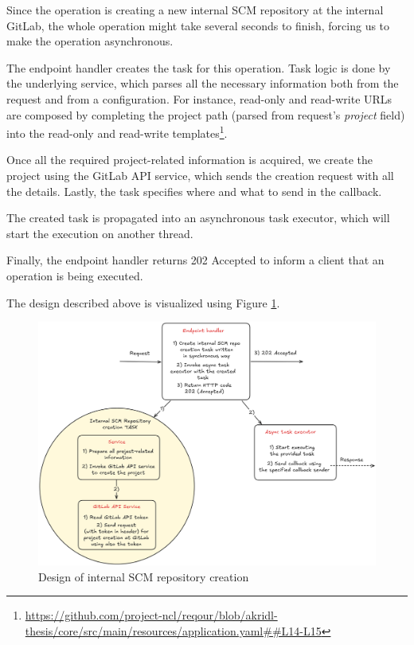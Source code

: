\documentclass[./main.tex]{subfiles}
\begin{document}
Since the operation is creating a new internal SCM repository at the internal GitLab, the whole operation might take several seconds to finish, forcing us to make the operation asynchronous.

The endpoint handler creates the task for this operation. Task logic is done by the underlying service, which parses all the necessary information both from the request and from a configuration. For instance, read-only and read-write URLs are composed by completing the project path (parsed from request's \textit{project} field) into the read-only and read-write templates\footnote{\url{https://github.com/project-ncl/reqour/blob/akridl-thesis/core/src/main/resources/application.yaml##L14-L15}}.

Once all the required project-related information is acquired, we create the project using the GitLab API service, which sends the creation request with all the details. Lastly, the task specifies where and what to send in the callback.

The created task is propagated into an asynchronous task executor, which will start the execution on another thread.

Finally, the endpoint handler returns 202 Accepted to inform a client that an operation is being executed.

The design described above is visualized using Figure \ref{fig:internal-scm-design}.

\begin{figure}
  \begin{center}
    \includegraphics[width=\textwidth]{images/internal-scm-design.png}
  \end{center}
  \caption{Design of internal SCM repository creation}
  \label{fig:internal-scm-design}
\end{figure}
\end{document}
